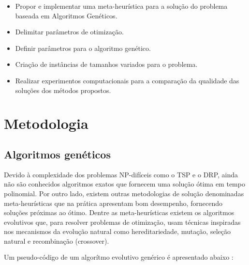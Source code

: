 \documentclass[12pt]{elsarticle}
\begin{document}
    \begin{itemize}
    \item Propor e implementar uma meta-heurística para a solução do problema baseada em Algoritmos Genéticos.
    \item Delimitar parâmetros de otimização.
    \item Definir parâmetros para o algoritmo genético.
    \item Criação de instâncias de tamanhos variados para o problema.
    \item Realizar experimentos computacionais para a comparação da qualidade das soluções dos métodos propostos.
    \end{itemize}
	
    
	\section{Metodologia} \label{metodologia}
    
    \subsection{Algoritmos genéticos}
    
    Devido à complexidade dos problemas NP-difíceis como o TSP e o DRP, ainda não são conhecidos algoritmos exatos que fornecem uma solução ótima em tempo polinomial. Por outro lado, existem outras metodologias de solução denominadas meta-heurísticas que na prática apresentam bom desempenho, fornecendo soluções próximas ao ótimo. Dentre as meta-heurísticas existem os algoritmos evolutivos que, para resolver problemas de otimização, usam técnicas inspiradas nos mecanismos da evolução natural como hereditariedade, mutação, seleção natural e recombinação (crossover).
    
    Um pseudo-código de um algorítmo evolutivo genérico é apresentado abaixo \cite{reeves}: \\
    
\end{document}
